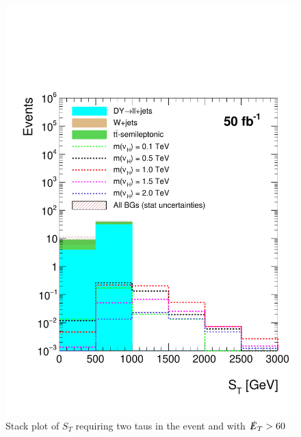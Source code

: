 \begin{figure}[H]
\centering
\includegraphics[width=\linewidth]{StackPlots/ST_2Taus_met60_50ifb_2moreSignals.pdf}
\caption{Stack plot of $S_{T}$ requiring two taus in the event and with $\slashed{E}_{T} > 60$}
\label{fig: ST2tausMet60}
\end{figure}



